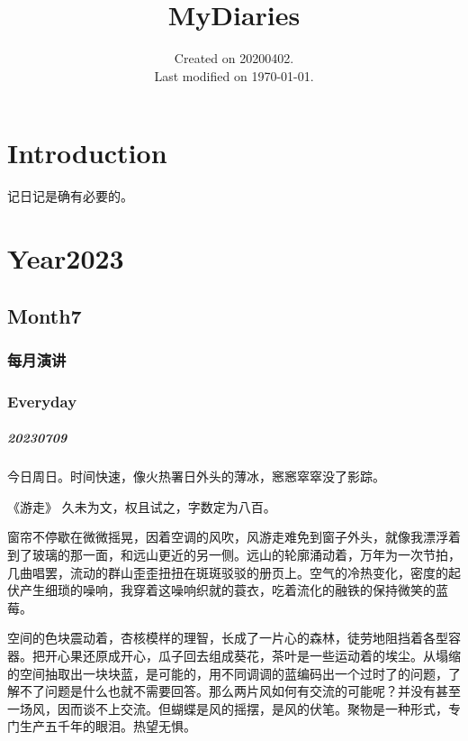\documentclass[UTF8]{Diaries}
\begin{document}
\title{MyDiaries}
\date{Created on 20200402.\\   Last modified on \today.}
\maketitle
\tableofcontents




\chapter{Introduction}

记日记是确有必要的。

\chapter{Year2023}


\section{Month7}
\subsection{每月演讲}


\subsection{Everyday}


\paragraph{20230709}
今日周日。时间快速，像火热署日外头的薄冰，窸窸窣窣没了影踪。

《游走》
久未为文，权且试之，字数定为八百。

窗帘不停歇在微微摇晃，因着空调的风吹，风游走难免到窗子外头，就像我漂浮着到了玻璃的那一面，和远山更近的另一侧。远山的轮廓涌动着，万年为一次节拍，几曲唱罢，流动的群山歪歪扭扭在斑斑驳驳的册页上。空气的冷热变化，密度的起伏产生细琐的噪响，我穿着这噪响织就的蓑衣，吃着流化的融铁的保持微笑的蓝莓。

空间的色块震动着，杏核模样的理智，长成了一片心的森林，徒劳地阻挡着各型容器。把开心果还原成开心，瓜子回去组成葵花，茶叶是一些运动着的埃尘。从塌缩的空间抽取出一块块蓝，是可能的，用不同调调的蓝编码出一个过时了的问题，了解不了问题是什么也就不需要回答。那么两片风如何有交流的可能呢？并没有甚至一场风，因而谈不上交流。但蝴蝶是风的摇摆，是风的伏笔。聚物是一种形式，专门生产五千年的眼泪。热望无惧。
\end{document}
